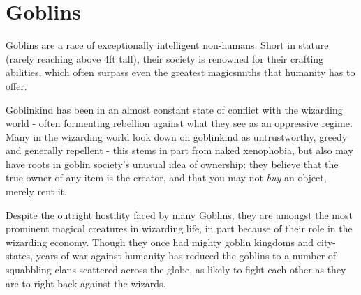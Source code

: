  
\section{Goblins}

Goblins are a race of exceptionally intelligent non-humans. Short in stature (rarely reaching above 4ft tall), their society is renowned for their crafting abilities, which often surpass even the greatest magicsmiths that humanity has to offer. 

Goblinkind has been in an almost constant state of conflict with the wizarding world - often formenting rebellion against what they see as an oppressive regime. Many in the wizarding world look down on goblinkind as untrustworthy, greedy and generally repellent - this stems in part from naked xenophobia, but also may have roots in goblin society's unusual idea of ownership: they believe that the true owner of any item is the creator, and that you may not {\it buy} an object, merely rent it. 

Despite the outright hostility faced by many Goblins, they are amongst the most prominent magical creatures in wizarding life, in part because of their role in the wizarding economy. Though they once had mighty goblin kingdoms and city-states, years of war against humanity has reduced the goblins to a number of squabbling clans scattered across the globe, as likely to fight each other as they are to right back against the wizards. 
	
